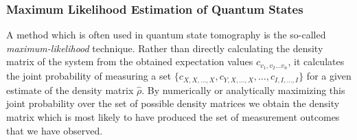 \subsubsection{Maximum Likelihood Estimation of Quantum States}

A method which is often used in quantum state tomography is the so-called {\it maximum-likelihood} technique. Rather than directly calculating the density matrix of the system from the obtained expectation values $c_{v_1,v_2\hdots v_n}$, it calculates the joint probability of measuring a set $\{c_{X,X,\hdots,X},c_{Y,X,\hdots,X},\hdots,c_{I,I,\hdots,I}\}$ for a given estimate of the density matrix $\hat{\rho}$. By numerically or analytically maximizing this joint probability over the set of possible density matrices we obtain the density matrix which is most likely to have produced the set of measurement outcomes that we have observed.

